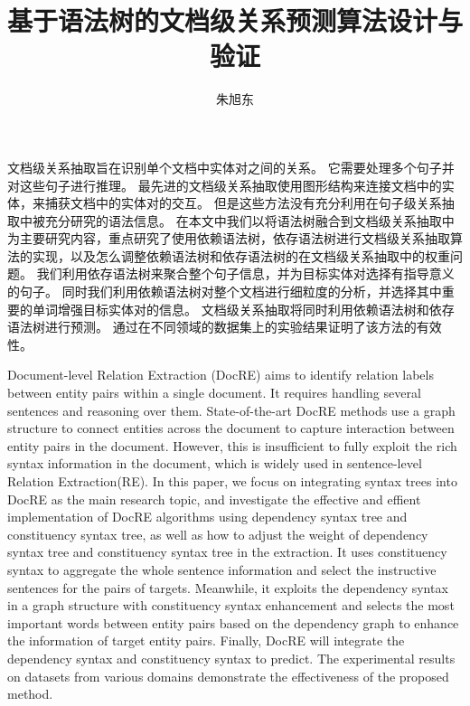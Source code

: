 \documentclass[bachelor]{thesis-uestc}
\title{基于语法树的文档级关系预测算法设计与验证}{Design and Verification of Document-level Relation Extraction Algorithm Based on Syntax Tree}
\author{朱旭东}{Xudong Zhu}
\begin{document}
\makecover

\begin{chineseabstract}
    文档级关系抽取旨在识别单个文档中实体对之间的关系。
    它需要处理多个句子并对这些句子进行推理。
    最先进的文档级关系抽取使用图形结构来连接文档中的实体，来捕获文档中的实体对的交互。 
    但是这些方法没有充分利用在句子级关系抽取中被充分研究的语法信息。
    在本文中我们以将语法树融合到文档级关系抽取中为主要研究内容，重点研究了使用依赖语法树，依存语法树进行文档级关系抽取算法的实现，以及怎么调整依赖语法树和依存语法树的在文档级关系抽取中的权重问题。
    我们利用依存语法树来聚合整个句子信息，并为目标实体对选择有指导意义的句子。
    同时我们利用依赖语法树对整个文档进行细粒度的分析，并选择其中重要的单词增强目标实体对的信息。
    文档级关系抽取将同时利用依赖语法树和依存语法树进行预测。
    通过在不同领域的数据集上的实验结果证明了该方法的有效性。 


\end{chineseabstract}

\begin{englishabstract}
    Document-level Relation Extraction (DocRE) aims to identify relation labels between entity pairs within a single document. 
    It requires handling several sentences and reasoning over them.
    State-of-the-art DocRE methods use a graph structure to connect entities across the document to capture interaction between entity pairs in the document.
    However, this is insufficient to fully exploit the rich syntax information in the document, which is widely used in sentence-level Relation Extraction(RE). 
    In this paper, we focus on integrating syntax trees into DocRE as the main research topic, and investigate the effective and effient implementation of DocRE algorithms using dependency syntax tree and constituency syntax tree, as well as how to adjust the weight of dependency syntax tree and constituency syntax tree in the extraction. 
    It uses constituency syntax to aggregate the whole sentence information and select the instructive sentences for the pairs of targets. 
    Meanwhile, it exploits the dependency syntax in a graph structure with constituency syntax enhancement and selects the most important words between entity pairs based on the dependency graph to enhance the information of target entity pairs. 
    Finally, DocRE will integrate the dependency syntax and constituency syntax to predict.
    The experimental results on datasets from various domains demonstrate the effectiveness of the proposed method.


\end{englishabstract}
\end{document}

